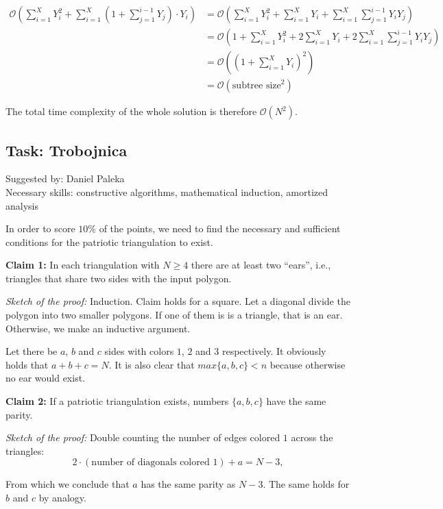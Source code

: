 \documentclass[a4paper]{article}
\begin{document}
\begin{align*}
    \mathcal{O} \left( \sum_{i=1}^{X} Y_i^2 +
    \sum_{i=1}^{X}(1 + \sum_{j=1}^{i-1}Y_j) \cdot Y_i \right)
    &= \mathcal{O} \left( \sum_{i=1}^{X}Y_i^2 + \sum_{i=1}^{X}Y_i +
    \sum_{i=1}^{X}\sum_{j=1}^{i-1}Y_i Y_j \right) \\
    &= \mathcal{O} \left( 1 + \sum_{i=1}^{X}Y_i^2 + 2\sum_{i=1}^{X}Y_i +
    2\sum_{i=1}^{X}\sum_{j=1}^{i-1}Y_i Y_j \right) \\
    &= \mathcal{O} \left( (1 + \sum_{i=1}^X Y_i)^2 \right) \\
    &= \mathcal{O} (\text{subtree size}^2)
\end{align*}

The total time complexity of the whole solution is therefore $\mathcal{O}(N^2)$.

\clearpage

\subsection*{Task: Trobojnica}
\textsf{Suggested by: Daniel Paleka}\\
\textsf{Necessary skills: constructive algorithms, mathematical induction, amortized analysis}

In order to score $10\%$ of the points, we need to find the necessary and
sufficient conditions for the patriotic triangulation to exist.

\textbf{Claim 1: } \; In each triangulation with $N \ge 4$ there are at least
two ``ears'', i.e., triangles that share two sides with the input polygon.

\emph{Sketch of the proof: } \; Induction. Claim holds for a square.
Let a diagonal divide the polygon into two smaller polygons. If one of them is
is a triangle, that is an ear. Otherwise, we make an inductive argument.

Let there be $a$, $b$ and $c$ sides with colors $1$, $2$ and $3$ respectively.
It obviously holds that $a+b+c=N$. It is also clear that $max\{a, b, c\} < n$
because otherwise no ear would exist.

\textbf{Claim 2: } \; If a patriotic triangulation exists, numbers $\{a, b, c\}$
have the same parity.

\emph{Sketch of the proof: } \; Double counting the number of edges colored $1$ across the triangles:
$$
  2 \cdot (\text{number of diagonals colored 1}) + a = N - 3,
$$

From which we conclude that $a$ has the same parity as $N - 3$. The same holds
for $b$ and $c$ by analogy.
\end{document}
